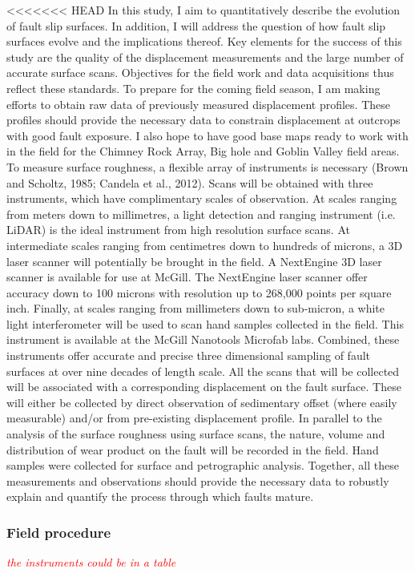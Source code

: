 \documentclass[12pt,a4paper]{article}
\begin{document}
<<<<<<< HEAD
In this study, I aim to quantitatively describe the evolution of fault slip surfaces. In addition, I will address the question of how fault slip surfaces evolve and the implications thereof. Key elements for the success of this study are the quality of the displacement measurements and the large number of accurate surface scans.  Objectives for the field work and data acquisitions thus reflect these standards. To prepare for the coming field season, I am making efforts to obtain raw data of previously measured displacement profiles. These profiles should provide the necessary data to constrain displacement at outcrops with good fault exposure. I also hope to have good base maps ready to work with in the field for the Chimney Rock Array, Big hole and Goblin Valley field areas. 
To measure surface roughness, a flexible array of instruments is necessary (Brown and Scholtz, 1985; Candela et al., 2012). Scans will be obtained with three instruments, which have complimentary scales of observation. At scales ranging from meters down to millimetres, a light detection and ranging instrument (i.e. LiDAR) is the ideal instrument from high resolution surface scans. At intermediate scales ranging from centimetres down to hundreds of microns, a 3D laser scanner will potentially be brought in the field. A NextEngine 3D laser scanner is available for use at McGill. The NextEngine laser scanner offer accuracy down to 100 microns with resolution up to 268,000 points per square inch. Finally, at scales ranging from millimeters down to sub-micron, a white light interferometer will be used to scan hand samples collected in the field. This instrument is available at the McGill Nanotools Microfab labs. Combined, these instruments offer accurate and precise three dimensional sampling of fault surfaces at over nine decades of length scale. All the scans that will be collected will be associated with a corresponding displacement on the fault surface. These will either be collected by direct observation of sedimentary offset (where easily measurable) and/or from pre-existing displacement profile.
In parallel to the analysis of the surface roughness using surface scans, the nature, volume and distribution of wear product on the fault will be recorded in the field. Hand samples were collected for surface and petrographic analysis. Together, all these measurements and observations should provide the necessary data to robustly explain and quantify the process through which faults mature.
		\subsubsection{Field procedure}
		\textcolor{red}{\textit{the instruments could be in a table}}	
\end{document}
